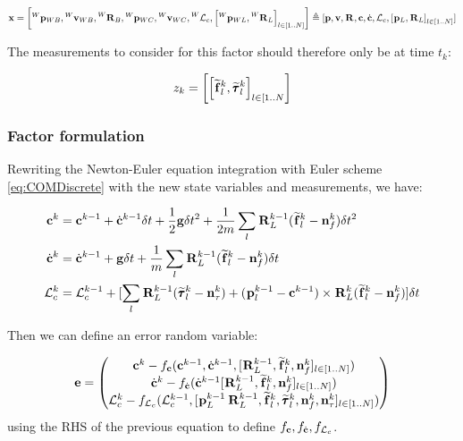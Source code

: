 \documentclass[11pt]{article}
\newcommand{\Rot}[2]{\prescript{#1}{}{\bfR}_{#2}}
\newcommand{\noise}{\bfn}
\newcommand{\posi}[2]{\prescript{#1}{}{\bfp}_{#2}}
\newcommand{\vel}[2]{\prescript{#1}{}{\bfv}_{#2}}
\newcommand{\forcem}[2]{\prescript{#1}{}{\widetilde{\bff}}_{#2}}
\newcommand{\torquem}[2]{\prescript{#1}{}{\widetilde{\pmb{\tau}}}_{#2}}
\newcommand{\AM}{\mathcal{L}}
\newcommand{\COM}{\bfc}
\newcommand{\COMd}{\dot{\bfc}}
\begin{document}
\begin{equation*}
\bfx = \left[\posi{W}{WB}, \vel{W}{WB}, \Rot{W}{B}, \posi{W}{WC}, \vel{W}{WC}, \prescript{W}{}{\AM}_{c}, \left[\posi{W}{WL}, \Rot{W}{L}\right]_{l \in [1..N]} \right] 
\triangleq 
[\bfp, \bfv, \Rot{}{}, \COM, \COMd, \AM_c, \left[\posi{}{L}, \Rot{}{L}\right]_{l \in [1..N]} ] 
\end{equation*}

The measurements to consider for this factor should therefore only be at time $t_k$:

\begin{equation}
z_k = \left[\left[\forcem{}{l}^k, \torquem{}{l}^k \right]_{l \in [1..N} \right]
\end{equation}


\subsubsection{Factor formulation}
Rewriting the Newton-Euler equation integration with Euler scheme \ref{eq:COMDiscrete} with the new state variables and measurements, we have:

\begin{equation}
\begin{split}
\COM^{k} &= \COM^{k-1} + \COMd^{k-1} \delta t 
+ \frac{1}{2} \bfg \delta t^2 + \frac{1}{2m} \sum_l \Rot{}{L}^{k-1} (\forcem{}{l}^{k} - \noise_f^{k}) \delta t^2
\\
\COMd^{k}&= \COMd^{k-1} + \bfg \delta t + \frac{1}{m} \sum_l \Rot{}{L}^{k-1} (\forcem{}{l}^{k} - \noise_f^{k}) \delta t 
\\
\AM_c^{k} &= \AM_c^{k-1} +  [ 
\sum_l \Rot{}{L}^{k-1}(\torquem{}{l}^{k} - \noise_{\tau}^{k}) + (\posi{}{l}^{k-1} - \COM^{k-1}) \times \Rot{}{L}^{k}(\forcem{}{l}^{k} - \noise_f^{k}) 
] \delta t
\end{split}
\label{eq:COMDiscreteFeet}
\end{equation}

Then we can define an error random variable:

\begin{equation}
	\bfe =
	\begin{pmatrix}
	\COM^k - f_{\COM}(\COM^{k-1}, \COMd^{k-1}, [\Rot{}{L}^{k-1}, \forcem{}{l}^k, \noise_f^k]_{l \in [1..N]})
	\\
	\COMd^k - f_{\COMd}(\COMd^{k-1} [\Rot{}{L}^{k-1}, \forcem{}{l}^k, \noise_f^k]_{l \in [1..N]})
	\\
	\AM_c^k - f_{\AM_c}(\AM_c^{k-1}, [\posi{}{L}^{k-1} \Rot{}{L}^{k-1}, \forcem{}{l}^k, \torquem{}{l}^k, \noise_f^k, \noise_{\tau}^k]_{l \in [1..N]})	
	\end{pmatrix}
\end{equation}
using the RHS of the previous equation to define $f_{\COM},f_{\COMd},f_{\AM_c}$.
\end{document}
